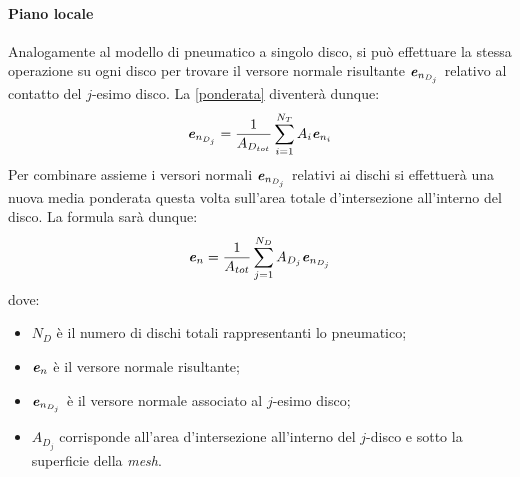 \paragraph{Piano locale}
Analogamente al modello di pneumatico a singolo disco, si può effettuare la stessa operazione su ogni disco per trovare il versore normale risultante $\textbf{\textit{e}}_{n_{D_j}}$ relativo al contatto del $j$-esimo disco. La \eqref{ponderata} diventerà dunque:
%
\begin{equation}
\textbf{\textit{e}}_{n_{D_j}} = \frac{1}{A_{D_{tot}}}\sum_{i=1}^{N_T}A_i\textbf{\textit{e}}_{n_i}
\end{equation}
%
Per combinare assieme i versori normali $\textbf{\textit{e}}_{n_{D_j}}$ relativi ai dischi si effettuerà una nuova media ponderata questa volta sull'area totale d'intersezione all'interno del disco. La formula sarà dunque:
%
\begin{equation}
\textbf{\textit{e}}_n = \frac{1}{A_{tot}}\sum_{j=1}^{N_D}A_{D_j}\textbf{\textit{e}}_{n_{D_j}}
\end{equation}
%
dove:
\begin{itemize}
	\item $N_D$ è il numero di dischi totali rappresentanti lo pneumatico;
	\item $\textbf{\textit{e}}_n$ è il versore normale risultante;
	\item $\textbf{\textit{e}}_{n_{D_j}}$ è il versore normale associato al $j$-esimo disco;
	\item $A_{D_j}$ corrisponde all'area d'intersezione all'interno del $j$-disco e sotto la superficie della \textit{mesh}.
\end{itemize}
